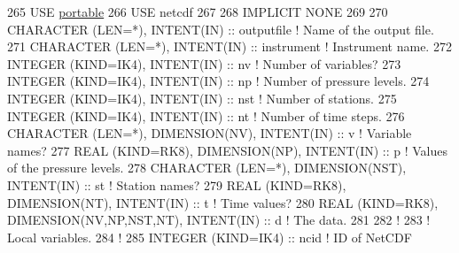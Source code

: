 \begin{DoxyCode}
265     \textcolor{keywordtype}{USE }\hyperlink{namespaceportable}{portable}
266     \textcolor{keywordtype}{USE }netcdf
267 
268     \textcolor{keywordtype}{IMPLICIT NONE}
269 
270     \textcolor{keywordtype}{CHARACTER (LEN=*)}, \textcolor{keywordtype}{INTENT(IN)}                                       :: outputfile   \textcolor{comment}{! Name of the
       output file.}
271     \textcolor{keywordtype}{CHARACTER (LEN=*)}, \textcolor{keywordtype}{INTENT(IN)}                                       :: instrument   \textcolor{comment}{! Instrument name.}
272     \textcolor{keywordtype}{INTEGER (KIND=IK4)}, \textcolor{keywordtype}{INTENT(IN)}                                      :: nv           \textcolor{comment}{! Number of
       variables?}
273     \textcolor{keywordtype}{INTEGER (KIND=IK4)}, \textcolor{keywordtype}{INTENT(IN)}                                      :: np           \textcolor{comment}{! Number of
       pressure levels.}
274     \textcolor{keywordtype}{INTEGER (KIND=IK4)}, \textcolor{keywordtype}{INTENT(IN)}                                      :: nst          \textcolor{comment}{! Number of
       stations.}
275     \textcolor{keywordtype}{INTEGER (KIND=IK4)}, \textcolor{keywordtype}{INTENT(IN)}                                      :: nt           \textcolor{comment}{! Number of time
       steps.}
276     \textcolor{keywordtype}{CHARACTER (LEN=*)}, \textcolor{keywordtype}{DIMENSION(NV)},  \textcolor{keywordtype}{INTENT(IN)}                       :: v            \textcolor{comment}{! Variable names?}
277     \textcolor{keywordtype}{REAL (KIND=RK8)}, \textcolor{keywordtype}{DIMENSION(NP)}, \textcolor{keywordtype}{INTENT(IN)}                          :: p            \textcolor{comment}{! Values of the
       pressure levels.}
278     \textcolor{keywordtype}{CHARACTER (LEN=*)}, \textcolor{keywordtype}{DIMENSION(NST)}, \textcolor{keywordtype}{INTENT(IN)}                       :: st           \textcolor{comment}{! Station names?}
279     \textcolor{keywordtype}{REAL (KIND=RK8)}, \textcolor{keywordtype}{DIMENSION(NT)}, \textcolor{keywordtype}{INTENT(IN)}                          :: t            \textcolor{comment}{! Time values?}
280     \textcolor{keywordtype}{REAL (KIND=RK8)}, \textcolor{keywordtype}{DIMENSION(NV,NP,NST,NT)}, \textcolor{keywordtype}{INTENT(IN)}                :: d            \textcolor{comment}{! The data.}
281 
282     \textcolor{comment}{!}
283     \textcolor{comment}{! Local variables.}
284     \textcolor{comment}{!}
285     \textcolor{keywordtype}{INTEGER (KIND=IK4)}          :: ncid                                                 \textcolor{comment}{! ID of NetCDF
}
\end{DoxyCode}

